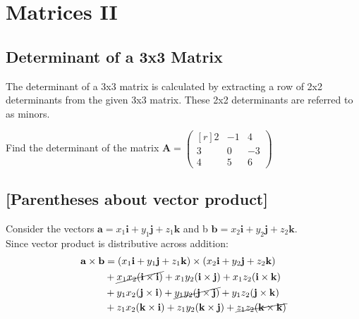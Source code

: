 

\chapter{Matrices II}
\section{Determinant of a 3x3 Matrix}
The determinant of a 3x3 matrix is calculated by extracting a row of 2x2 determinants from the given 3x3 matrix. These 2x2 determinants are referred to as minors.

\begin{example}
	Find the determinant of the matrix $\mathbf A = \begin{pmatrix*}[r]
	2 &-1 &4\\
	3 &0 &-3\\
	4 &5 &6
	\end{pmatrix*}$
\end{example}
\section{[Parentheses about vector product]}
Consider the vectors $\mathbf{a} = x_1\mathbf{i} + y_1\mathbf{j} + z_1\mathbf{k}$ and b $\mathbf{b} = x_2\mathbf{i} + y_2\mathbf{j} + z_2\mathbf{k}$.\\

Since vector product is distributive across addition:\\

\begin{align*}
	\mathbf{a} \times \mathbf{b} & = \left(  x_1\mathbf{i} + y_1\mathbf{j} + z_1\mathbf{k} \right) \times \left( x_2\mathbf{i} + y_2\mathbf{j} + z_2\mathbf{k} \right)\\
	&+\cancel{x_1x_2(\mathbf i \times \mathbf i)} + x_1y_2(\mathbf i \times \mathbf j) + x_1z_2(\mathbf i \times \mathbf k)\\
	&+ y_1x_2(\mathbf j \times \mathbf i) + \cancel{y_1y_2(\mathbf j \times \mathbf j)} + y_1z_2(\mathbf j \times \mathbf k)\\
	&+z_1x_2(\mathbf k \times \mathbf i) + z_1y_2(\mathbf k \times \mathbf j) + \cancel{z_1z_2(\mathbf k \times \mathbf k)}
\end{align*}

